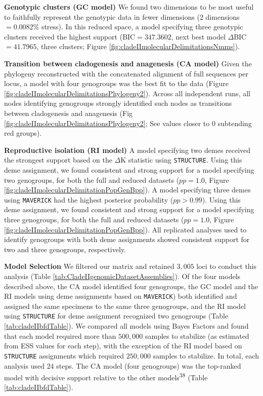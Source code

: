 \documentclass[
  11pt,
]{article}
\begin{document}
\textbf{Genotypic clusters (GC model)} We found two dimensions to be most useful to faithfully represent the genotypic data in fewer dimensions (2 dimensions \(=0.0082\%\) stress). In this reduced space, a model specifying three genotypic clusters received the highest support (BIC\(=347.3602\), next best model \(\Delta\)BIC\(=41.7965\), three clusters; Figure \ref{fig:cladeIImolecularDelimitationsNmms}).

\textbf{Transition between cladogenesis and anagenesis (CA model)} Given the phylogeny reconstructed with the concatenated alignment of full sequences per locus, a model with four genogroups was the best fit to the data (Figure \ref{fig:cladeIImolecularDelimitationsPhylogeny2}). Across all independent runs, all nodes identifying genogroups strongly identified such nodes as transitions between cladogenesis and anagenesis (Fig \ref{fig:cladeIImolecularDelimitationsPhylogeny2}; See values closer to \(0\) subtending red groups).

\textbf{Reproductive isolation (RI model)} A model specifying two demes received the strongest support based on the \(\Delta\)K statistic using \texttt{STRUCTURE}. Using this deme assignment, we found consistent and strong support for a model specifying two genogroups, for both the full and reduced datasets (\(pp=1.0\), Figure \ref{fig:cladeIImolecularDelimitationPopGenBpp}). A model specifying three demes using \texttt{MAVERICK} had the highest posterior probability (\(pp>0.99\)). Using this deme assignment, we found consistent and strong support for a model specifying three genogroups, for both the full and reduced datasets (\(pp=1.0\), Figure \ref{fig:cladeIImolecularDelimitationPopGenBpp}). All replicated analyses used to identify genogroups with both deme assignments showed consistent support for two and three genogroups, respectively.

\textbf{Model Selection} We filtered our matrix and retained \(3,005\) loci to conduct this analysis (Table \ref{tab:CladeIIgenomicDatasetAssemblies}). Of the four models described above, the CA model identified four genogroups, the GC model and the RI models using deme assignments based on \texttt{MAVERICK}) both identified and assigned the same specimens to the same three genogroups, and the RI model using \texttt{STRUCTURE} for deme assignment recognized two genogroups (Table \ref{tab:cladeIIbfdTable}). We compared all models using Bayes Factors and found that each model required more than \(500,000\) samples to stabilize (as estimated from ESS values for each step), with the exception of the RI model based on \texttt{STRUCTURE} assignments which required \(250,000\) samples to stabilize. In total, each analysis used \(24\) steps. The CA model (four genogroups) was the top-ranked model with decisive support relative to the other models\textsuperscript{38} (Table \ref{tab:cladeIIbfdTable}).
\end{document}
